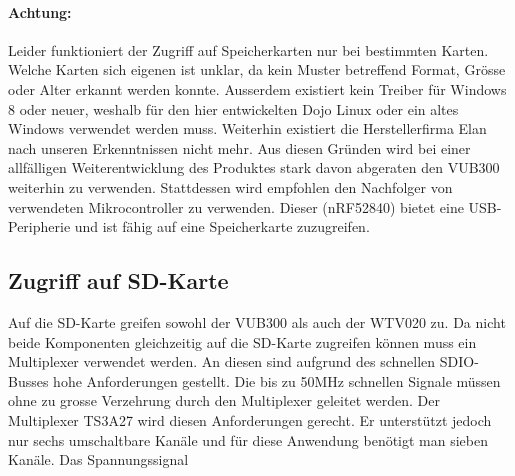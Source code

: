\paragraph{Achtung:} Leider funktioniert der Zugriff auf Speicherkarten nur bei bestimmten Karten. 
Welche Karten sich eigenen ist unklar, da kein Muster betreffend Format, Grösse oder Alter erkannt werden konnte.
Ausserdem existiert kein Treiber für Windows 8 oder neuer, weshalb für den hier entwickelten Dojo Linux oder ein altes Windows verwendet werden muss.
Weiterhin existiert die Herstellerfirma Elan nach unseren Erkenntnissen nicht mehr. Aus diesen Gründen wird bei einer allfälligen Weiterentwicklung des Produktes stark davon abgeraten den VUB300 weiterhin zu verwenden.
Stattdessen wird empfohlen den Nachfolger von verwendeten Mikrocontroller zu verwenden. Dieser (nRF52840) bietet eine USB-Peripherie und ist fähig auf eine Speicherkarte zuzugreifen. 

\subsection{Zugriff auf SD-Karte}\label{sec:SD_KART}
Auf die SD-Karte greifen sowohl der VUB300 als auch der WTV020 zu. Da nicht beide Komponenten gleichzeitig auf die SD-Karte zugreifen können muss ein Multiplexer verwendet werden.
An diesen sind aufgrund des schnellen SDIO-Busses hohe Anforderungen gestellt. Die bis zu 50MHz schnellen Signale müssen ohne zu grosse Verzehrung durch den Multiplexer geleitet werden. Der Multiplexer TS3A27 wird diesen Anforderungen gerecht.
Er unterstützt jedoch nur sechs umschaltbare Kanäle und für diese Anwendung benötigt man sieben Kanäle. Das Spannungssignal 

\newpage
  